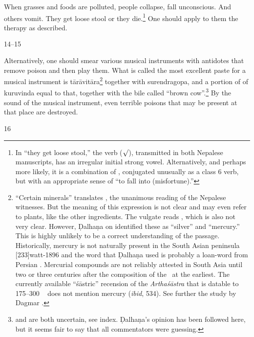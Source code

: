 \begin{translation}
When grasses and foods are  polluted, people collapse, fall
unconscious. And others vomit. They get  loose 
stool or they  die.\footnote{In “they get loose stool,” the verb
     ($\surd$), transmitted in both Nepalese
    manuscripts, has an irregular initial strong vowel. Alternatively, and
    perhaps more likely, it is a combination of ,
    conjugated unusually as a class 6 verb, but with an appropriate sense
    of “to fall into (misfortune).”}  One should apply to them the therapy
    as described.

\item [14--15]  

Alternatively, one should smear  various musical instruments with
antidotes that remove poison and then play  them. What is called the
most  excellent paste for a musical instrument is
\gls{tārāvitāra}\footnote{“Certain  minerals” translates
    , the unanimous  reading of the Nepalese  witnesses.
    But the meaning of this expression is not  clear and may even refer to
    plants, like the other ingredients.  The vulgate  reads ,  which is also not very clear.  However, Ḍalhaṇa on
     identified  these as “silver” and “mercury.” This is
    highly unlikely  to be a correct understanding of  the passage.
    Historically, mercury is not  naturally present in the South  Asian
    peninsula [233]{watt-1896}  and the word  that
    Ḍalhaṇa used is probably a loan-word from  Persian \citep[sub
    \emph{paranda, parranda}][244b]{stei-pers}. Mercurial compounds are
    not  reliably attested in South Asia until two or three  centuries
    after the composition  of the \SS\ at the earliest.  The currently
    available  “śāstric” recension of the  \emph{Arthaśāstra} that is
    datable to 175--300 \CE\  \citep[29--31]{oliv-2013} does  not mention
    mercury (\emph{ibid}, 534). See further the study by  Dagmar \citet[17,
    \emph{et passim}]{wuja-2013b}.}  together with  \gls{surendragopa},
    and a  portion of of \gls{kuruvinda} equal to that,  together with the
    bile called  “brown cow”.\footnote{  and
         are both  uncertain, see index. Ḍalhaṇa's opinion has
        been followed here, but it  seems fair to say that all commentators
        were  guessing.} By the sound of  the musical instrument, even
        terrible poisons that may be present  at that place are destroyed.

\item [16]  


\end{translation}
